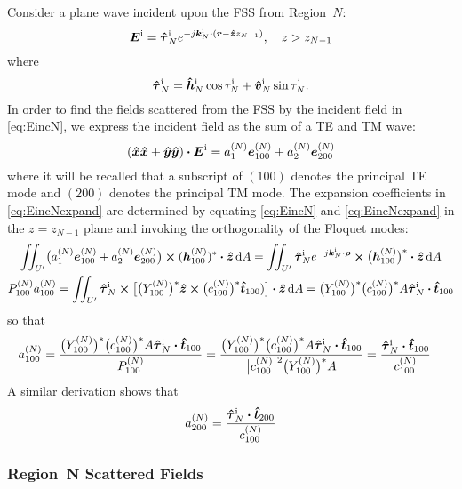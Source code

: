 \documentclass[11pt]{article}
\renewcommand{\inc}{^{\text{i}}}
\renewcommand{\abs}[1]{\bigl\lvert#1\bigr\rvert}
\begin{document}
Consider a plane wave incident upon the FSS from Region~$N$:
\begin{equation}
  \E\inc = \tauhat_N\inc e^{-j\k_N\inc \bdot (\r - \z z_{N-1})}, 
  \quad z>z_{N-1}
  \label{eq:EincN}
\end{equation}
where
\begin{equation}
  \tauhat_N\inc = \hhat_N\inc \cos \tau_N\inc + \vhat_N\inc \sin \tau_N\inc.
\end{equation}
In order to find the fields scattered from the FSS by the incident
field in \eqref{eq:EincN}, we express the incident field as the sum of
a TE and TM wave:
\begin{equation}
  (\x\x+\y\y) \bdot \E\inc = a_1\enn \e\enn_{100} + a_2\enn \e\enn_{200}
  \label{eq:EincNexpand}
\end{equation}
where it will be recalled that a subscript of $(100)$ denotes the
principal TE mode and $(200)$ denotes the principal TM mode.
The expansion coefficients in \eqref{eq:EincNexpand} are determined
by equating \eqref{eq:EincN} and \eqref{eq:EincNexpand} in the
$z=z_{N-1}$ plane and
invoking the orthogonality of the Floquet modes: 
\begin{gather}
  \iint_{U'} \bigl(a_1\enn \e\enn_{100} + a_2\enn \e\enn_{200}\bigr) \cross
  (\h\enn_{100})^* \bdot \z \, \d A 
  =
  \iint_{U'} \tauhat_N\inc e^{-j\k_N\inc \bdot \vecrho} \cross
  \bigl(\h\enn_{100}\bigr)^* \bdot \z \, \d A \nonumber \\
  P\enn_{100} a\enn_{100} =
  \iint_{U'} \tauhat_N\inc \cross 
  \bigl[
    \bigl(Y\enn_{100}\bigr)^* 
    \z \cross \bigl(c\enn_{100}\bigr)^* \t_{100})
  \bigr] \bdot \z \, \d A 
  =\bigl(Y\enn_{100}\bigr)^* \bigl(c\enn_{100}\bigr)^* A
  \tauhat_N\inc \bdot \t_{100}
\end{gather}
so that 
\begin{align}
  a\enn_{100} &= \frac{\bigl(Y\enn_{100}\bigr)^* %
    \bigl(c\enn_{100}\bigr)^* A   \tauhat_N\inc \bdot \t_{100}}%
  {P\enn_{100}}
  = 
  \frac{\bigl(Y\enn_{100}\bigr)^* %
    \bigl(c\enn_{100}\bigr)^* A   \tauhat_N\inc \bdot \t_{100}}%
  {\abs{c\enn_{100}}^2 \bigl(Y\enn_{100}\bigr)^* A} 
  = \frac{\tauhat_N\inc \bdot \t_{100}}{c\enn_{100}}
\end{align}
A similar derivation shows that
\begin{equation}
  a\enn_{200} = \frac{\tauhat_N\inc \bdot \t_{200}}{c\enn_{100}}
\end{equation}

\subsubsection[Region~\textit{N} Scattered Fields]%
{Region~$\boldsymbol{N}$ Scattered Fields}
\end{document}
